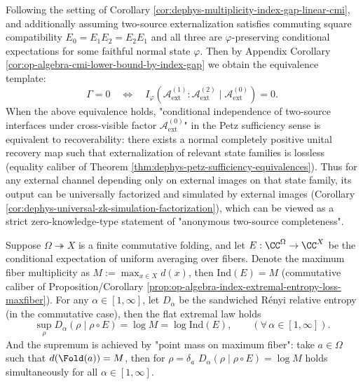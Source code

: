 \begin{corollary}\label{cor:dephys-two-source-anonymy-completeness-template}
Following the setting of Corollary \ref{cor:dephys-multiplicity-index-gap-linear-cmi}, and additionally assuming two-source externalization satisfies commuting square compatibility
\(
E_0=E_1E_2=E_2E_1
\)
and all three are \(\varphi\)-preserving conditional expectations for some faithful normal state \(\varphi\).
Then by Appendix Corollary \ref{cor:op-algebra-cmi-lower-bound-by-index-gap} we obtain the equivalence template:
\[
\boxed{\;
\Gamma=0
\quad\Longleftrightarrow\quad
I_\varphi(\mathcal{A}^{(1)}_{\mathrm{ext}}:\mathcal{A}^{(2)}_{\mathrm{ext}}\mid\mathcal{A}^{(0)}_{\mathrm{ext}})=0.\;}
\]
When the above equivalence holds, "conditional independence of two-source interfaces under cross-visible factor \(\mathcal{A}^{(0)}_{\mathrm{ext}}\)" in the Petz sufficiency sense is equivalent to recoverability: there exists a normal completely positive unital recovery map such that externalization of relevant state families is lossless (equality caliber of Theorem \ref{thm:dephys-petz-sufficiency-equivalences}).
Thus for any external channel depending only on external images on that state family, its output can be universally factorized and simulated by external images (Corollary \ref{cor:dephys-universal-zk-simulation-factorization}), which can be viewed as a strict zero-knowledge-type statement of "anonymous two-source completeness".
\end{corollary}

\begin{corollary}\label{cor:dephys-renyi-flatness-fold-commutative}
Suppose \(\Omega\twoheadrightarrow X\) is a finite commutative folding, and let \(E:\CC^{\Omega}\to\CC^{X}\) be the conditional expectation of uniform averaging over fibers.
Denote the maximum fiber multiplicity as \(M:=\max_{x\in X}d(x)\), then \(\mathrm{Ind}(E)=M\) (commutative caliber of Proposition/Corollary \ref{prop:op-algebra-index-extremal-entropy-loss-maxfiber}).
For any \(\alpha\in[1,\infty]\), let \(D_\alpha\) be the sandwiched Rényi relative entropy (in the commutative case), then the flat extremal law holds
\[
\boxed{\;
\sup_{\rho}D_\alpha(\rho\mid\rho\circ E)=\log M=\log\mathrm{Ind}(E),\qquad(\forall\,\alpha\in[1,\infty]).\;}
\]
And the supremum is achieved by "point mass on maximum fiber": take \(a\in\Omega\) such that \(d(\Fold(a))=M\), then for \(\rho=\delta_a\)
\(
D_\alpha(\rho\mid\rho\circ E)=\log M
\)
holds simultaneously for all \(\alpha\in[1,\infty]\).
\end{corollary}

